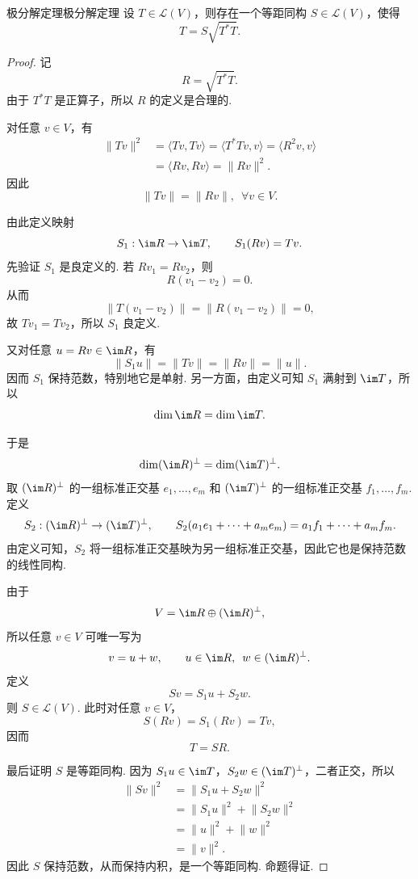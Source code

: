 \begin{theorem}{极分解定理}{极分解定理} 
    设 $T \in \mathcal{L}(V)$，则存在一个等距同构 $S \in \mathcal{L}(V)$，使得
    \[
        T = S\sqrt{T^*T}.
    \]
\end{theorem}

\begin{proof}
    记
    \[
        R = \sqrt{T^*T}.
    \]
    由于 $T^*T$ 是正算子，所以 $R$ 的定义是合理的.

    对任意 $v \in V$，有
    \begin{align*}
        \lVert Tv \rVert^2
         & = \langle Tv, Tv \rangle
          = \langle T^*Tv, v \rangle
          = \langle R^2v, v \rangle  \\
         & = \langle Rv, Rv \rangle
          = \lVert Rv \rVert^2.
    \end{align*}
    因此
    \[
        \lVert Tv \rVert = \lVert Rv \rVert,\enspace \forall v \in V.
    \]

    由此定义映射
    \[
        S_1 : \im R \to \im T,\qquad S_1(Rv) = Tv.
    \]
    先验证 $S_1$ 是良定义的. 若 $Rv_1 = Rv_2$，则
    \[
        R(v_1-v_2)=0.
    \]
    从而
    \[
        \lVert T(v_1-v_2) \rVert = \lVert R(v_1-v_2) \rVert = 0,
    \]
    故 $Tv_1 = Tv_2$，所以 $S_1$ 良定义.

    又对任意 $u = Rv \in \im R$，有
    \[
        \lVert S_1u \rVert = \lVert Tv \rVert = \lVert Rv \rVert = \lVert u \rVert.
    \]
    因而 $S_1$ 保持范数，特别地它是单射. 另一方面，由定义可知 $S_1$ 满射到 $\im T$，所以
    \[
        \dim \im R = \dim \im T.
    \]

    于是
    \[
        \dim (\im R)^\perp = \dim (\im T)^\perp.
    \]
    取 $(\im R)^\perp$ 的一组标准正交基 $e_1, \ldots, e_m$ 和 $(\im T)^\perp$ 的一组标准正交基 $f_1, \ldots, f_m$. 定义
    \[
        S_2 : (\im R)^\perp \to (\im T)^\perp,\qquad
        S_2(a_1e_1 + \cdots + a_me_m) = a_1f_1 + \cdots + a_mf_m.
    \]
    由定义可知，$S_2$ 将一组标准正交基映为另一组标准正交基，因此它也是保持范数的线性同构.

    由于
    \[
        V = \im R \oplus (\im R)^\perp,
    \]
    所以任意 $v \in V$ 可唯一写为
    \[
        v = u + w,\qquad u \in \im R,\enspace w \in (\im R)^\perp.
    \]
    定义
    \[
        Sv = S_1u + S_2w.
    \]
    则 $S \in \mathcal{L}(V)$. 此时对任意 $v \in V$，
    \[
        S(Rv) = S_1(Rv) = Tv,
    \]
    因而
    \[
        T = SR.
    \]

    最后证明 $S$ 是等距同构. 因为 $S_1u \in \im T$，$S_2w \in (\im T)^\perp$，二者正交，所以
    \begin{align*}
        \lVert Sv \rVert^2
         & = \lVert S_1u + S_2w \rVert^2 \\
         & = \lVert S_1u \rVert^2 + \lVert S_2w \rVert^2 \\
         & = \lVert u \rVert^2 + \lVert w \rVert^2 \\
         & = \lVert v \rVert^2.
    \end{align*}
    因此 $S$ 保持范数，从而保持内积，是一个等距同构. 命题得证.
\end{proof}

